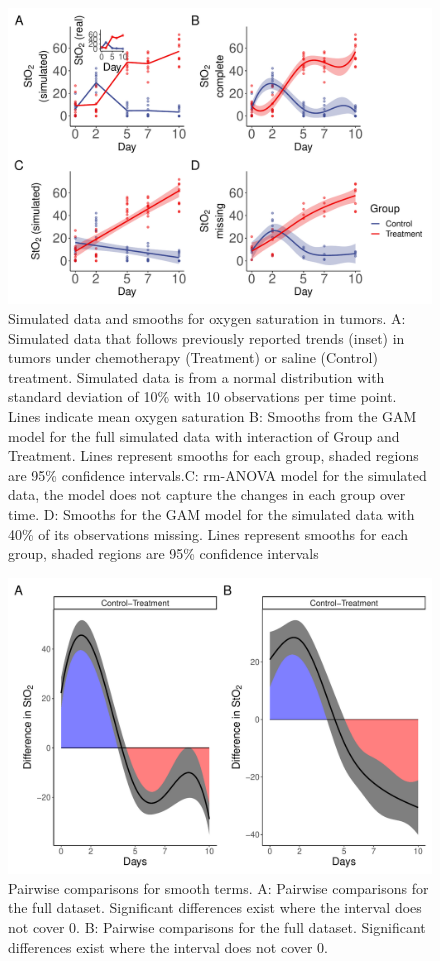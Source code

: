 \documentclass[
]{article}
\begin{document}
\begin{figure}[!h]

{\centering \includegraphics[width=0.75\linewidth,]{Manuscript_AM_v5_files/figure-latex/sim-smooth-plot-1} 

}

\caption{Simulated data and smooths for oxygen saturation in tumors. A: Simulated data that follows previously reported trends (inset) in tumors under chemotherapy (Treatment) or saline (Control) treatment. Simulated data is from a normal distribution with standard deviation of 10\% with 10 observations per time point. Lines indicate mean oxygen saturation B: Smooths from the GAM model for the full simulated data with interaction of Group and Treatment. Lines represent smooths for each group, shaded regions are 95\% confidence intervals.C: rm-ANOVA model for the simulated data, the model does not capture the changes in each group over time. D: Smooths for the GAM model for the simulated data with 40\% of its observations missing. Lines represent smooths for each group, shaded regions are 95\% confidence intervals}\label{fig:sim-smooth-plot}
\end{figure}



\begin{figure}[!h]

{\centering \includegraphics[width=0.75\linewidth,]{Manuscript_AM_v5_files/figure-latex/plot-pairwise-comp-1} 

}

\caption{Pairwise comparisons for smooth terms. A: Pairwise comparisons for the full dataset. Significant differences exist where the interval does not cover 0. B: Pairwise comparisons for the full dataset. Significant differences exist where the interval does not cover 0.}\label{fig:plot-pairwise-comp}
\end{figure}
\end{document}

